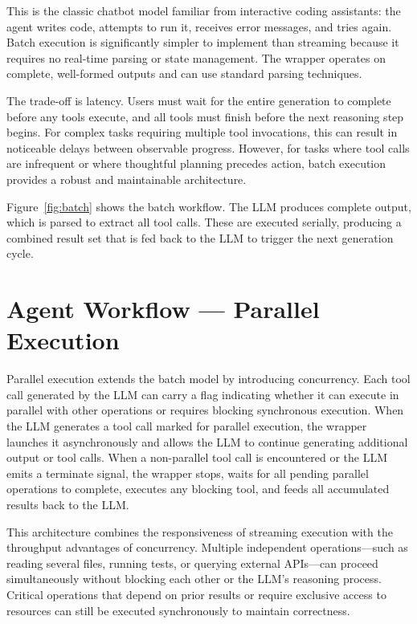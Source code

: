 This is the classic chatbot model familiar from interactive coding assistants: the agent writes code, attempts to run it, receives error messages, and tries again. Batch execution is significantly simpler to implement than streaming because it requires no real-time parsing or state management. The wrapper operates on complete, well-formed outputs and can use standard parsing techniques.

The trade-off is latency. Users must wait for the entire generation to complete before any tools execute, and all tools must finish before the next reasoning step begins. For complex tasks requiring multiple tool invocations, this can result in noticeable delays between observable progress. However, for tasks where tool calls are infrequent or where thoughtful planning precedes action, batch execution provides a robust and maintainable architecture.

Figure~\ref{fig:batch} shows the batch workflow. The LLM produces complete output, which is parsed to extract all tool calls. These are executed serially, producing a combined result set that is fed back to the LLM to trigger the next generation cycle.

\section{Agent Workflow --- Parallel Execution}\label{sec:parallel_exec}

Parallel execution extends the batch model by introducing concurrency. Each tool call generated by the LLM can carry a flag indicating whether it can execute in parallel with other operations or requires blocking synchronous execution. When the LLM generates a tool call marked for parallel execution, the wrapper launches it asynchronously and allows the LLM to continue generating additional output or tool calls. When a non-parallel tool call is encountered or the LLM emits a terminate signal, the wrapper stops, waits for all pending parallel operations to complete, executes any blocking tool, and feeds all accumulated results back to the LLM.

This architecture combines the responsiveness of streaming execution with the throughput advantages of concurrency. Multiple independent operations—such as reading several files, running tests, or querying external APIs—can proceed simultaneously without blocking each other or the LLM's reasoning process. Critical operations that depend on prior results or require exclusive access to resources can still be executed synchronously to maintain correctness.

